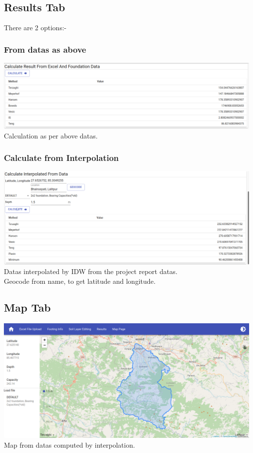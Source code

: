 \subsection{Results Tab}
There are 2 options:-\\
\subsubsection{From datas as above}
\includegraphics[width=\linewidth,keepaspectratio]{./extras/images/fed.png}
Calculation as per above datas.\\

\subsubsection{Calculate from Interpolation}
\includegraphics[width=\linewidth,keepaspectratio]{./extras/images/ID.png}
Datas interpolated by IDW from the project report datas.\\
Geocode from name, to get latitude and longitude.\\

\subsection{Map Tab}
\includegraphics[width=\linewidth,keepaspectratio]{./extras/images/map_page.png}
Map from datas computed by interpolation.